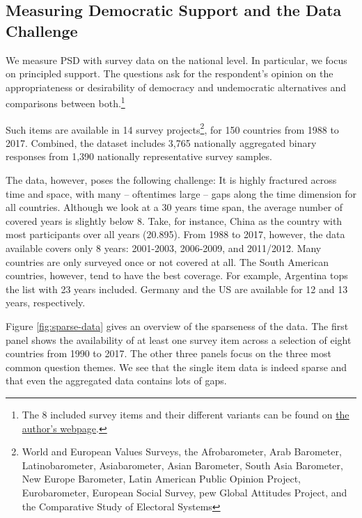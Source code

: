 \documentclass[12pt,english,a4paper,oneside]{article}
\theoremstyle{definition}
\theoremstyle{definition}
\theoremstyle{definition}
\theoremstyle{definition}
\theoremstyle{remark}
\begin{document}
\hypertarget{measuring-democratic-support-and-the-data-challenge}{%
\subsection{Measuring Democratic Support and the Data Challenge}\label{measuring-democratic-support-and-the-data-challenge}}

We measure PSD with survey data on the national level. In particular, we focus on principled support. The questions ask for the respondent's opinion on the appropriateness or desirability of democracy and undemocratic alternatives and comparisons between both.\footnote{The 8 included survey items and their different variants can be found on \href{http://chrisclaassen.com/docs/Democratic_mood_supp_materials.pdf}{the author's webpage}.}

Such items are available in 14 survey projects\footnote{World and European Values Surveys, the Afrobarometer, Arab Barometer, Latinobarometer, Asiabarometer, Asian Barometer, South Asia Barometer, New Europe Barometer, Latin American Public Opinion Project, Eurobarometer, European Social Survey, pew Global Attitudes Project, and the Comparative Study of Electoral Systems}, for 150 countries from 1988 to 2017. Combined, the dataset includes 3,765 nationally aggregated binary responses from 1,390 nationally representative survey samples.

The data, however, poses the following challenge: It is highly fractured across time and space, with many -- oftentimes large -- gaps along the time dimension for all countries. Although we look at a 30 years time span, the average number of covered years is slightly below 8. Take, for instance, China as the country with most participants over all years (20.895). From 1988 to 2017, however, the data available covers only 8 years: 2001-2003, 2006-2009, and 2011/2012. Many countries are only surveyed once or not covered at all. The South American countries, however, tend to have the best coverage. For example, Argentina tops the list with 23 years included. Germany and the US are available for 12 and 13 years, respectively.

Figure \ref{fig:sparse-data} gives an overview of the sparseness of the data. The first panel shows the availability of at least one survey item across a selection of eight countries from 1990 to 2017. The other three panels focus on the three most common question themes. We see that the single item data is indeed sparse and that even the aggregated data contains lots of gaps.
\end{document}
